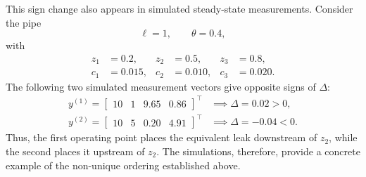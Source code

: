 This sign change also appears in simulated steady-state measurements. Consider the pipe
\[
\ell=1,
\qquad
\theta=0.4,
\]
with
\begin{align*}
z_1&=0.2,
&
z_2&=0.5,
&
z_3&=0.8,\\
c_1&=0.015,
&
c_2&=0.010,
&
c_3&=0.020.
\end{align*}
The following two simulated measurement vectors give opposite signs of $\Delta$:
\begin{align*}
y^{(1)}
=
\begin{bmatrix}
10 & 1 & 9.65 & 0.86
\end{bmatrix}^{\top}
&\implies
\Delta = 0.02>0,
\\
y^{(2)}
=
\begin{bmatrix}
10 & 5 & 0.20 & 4.91
\end{bmatrix}^{\top}
&\implies
\Delta = -0.04<0.
\end{align*}
Thus, the first operating point places the equivalent leak downstream of $z_2$, while the second places it upstream of $z_2$. The simulations, therefore, provide a concrete example of the non-unique ordering established above.